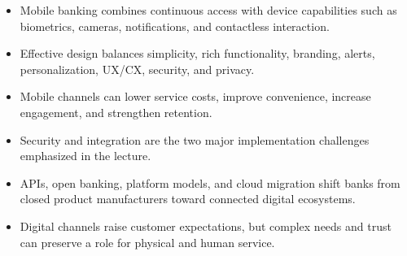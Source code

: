 \begin{chapterrecap}
\begin{itemize}
  \item Mobile banking combines continuous access with device capabilities such as biometrics, cameras, notifications, and contactless interaction.
  \item Effective design balances simplicity, rich functionality, branding, alerts, personalization, UX/CX, security, and privacy.
  \item Mobile channels can lower service costs, improve convenience, increase engagement, and strengthen retention.
  \item Security and integration are the two major implementation challenges emphasized in the lecture.
  \item APIs, open banking, platform models, and cloud migration shift banks from closed product manufacturers toward connected digital ecosystems.
  \item Digital channels raise customer expectations, but complex needs and trust can preserve a role for physical and human service.
\end{itemize}
\end{chapterrecap}


